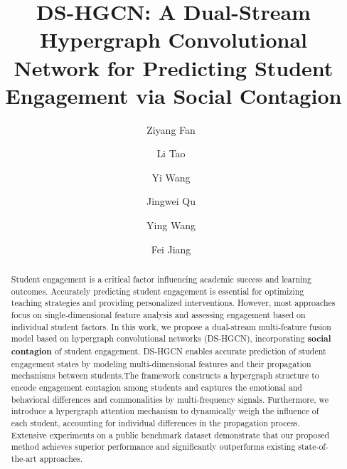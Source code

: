 \documentclass[runningheads]{llncs}
\begin{document}
%
\title{DS-HGCN: A Dual-Stream Hypergraph Convolutional Network for Predicting Student Engagement via Social Contagion}

\author{Ziyang Fan~ \and
	Li Tao\Envelope\inst{)}~ \and
	Yi Wang~ \and 
	Jingwei Qu~ \and
	Ying Wang~ \and 
	Fei Jiang~} 
%



%
%



\maketitle  %

\begin{abstract}
Student engagement is a critical factor influencing academic success and learning outcomes. Accurately predicting student engagement is essential for optimizing teaching strategies and providing personalized interventions. However, most approaches focus on single-dimensional feature analysis and assessing engagement based on individual student factors. In this work, we propose a dual-stream multi-feature fusion model based on hypergraph convolutional networks (DS-HGCN), incorporating \textbf{social contagion} of student engagement. DS-HGCN enables accurate prediction of student engagement states by modeling multi-dimensional features and their propagation mechanisms between students.The framework constructs a hypergraph structure to encode engagement contagion among students and captures the emotional and behavioral differences and commonalities by multi-frequency signals. Furthermore, we introduce a hypergraph attention mechanism to dynamically weigh the influence of each student, accounting for individual differences in the propagation process. Extensive experiments on a public benchmark dataset demonstrate that our proposed method achieves superior performance and significantly outperforms existing state-of-the-art approaches.
\end{abstract}
\end{document}
